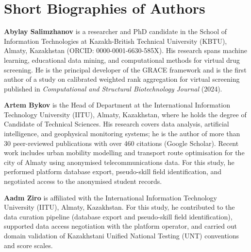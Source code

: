 \documentclass[11pt]{article}
\begin{document}
\section*{Short Biographies of Authors}

\textbf{Abylay Salimzhanov} is a researcher and PhD candidate in the School of
Information Technologies at Kazakh-British Technical University (KBTU), Almaty,
Kazakhstan (ORCID: 0000-0001-6630-585X).
His research spans machine learning, educational data mining, and computational
methods for virtual drug screening.
He is the principal developer of the GRACE framework and is the first author of
a study on calibrated weighted rank aggregation for virtual screening published
in \textit{Computational and Structural Biotechnology Journal} (2024).

\textbf{Artem Bykov} is the Head of Department at the International Information
Technology University (IITU), Almaty, Kazakhstan, where he holds the degree of
Candidate of Technical Sciences.
His research covers data analysis, artificial intelligence, and geophysical
monitoring systems; he is the author of more than 30 peer-reviewed publications
with over 460 citations (Google Scholar).
Recent work includes urban mobility modelling and transport route optimisation
for the city of Almaty using anonymised telecommunications data.
For this study, he performed platform database export, pseudo-skill field
identification, and negotiated access to the anonymised student records.

\textbf{Aadm Ziro} is affiliated with the International Information Technology
University (IITU), Almaty, Kazakhstan.
For this study, he contributed to the data curation pipeline (database export
and pseudo-skill field identification), supported data access negotiation with
the platform operator, and carried out domain validation of Kazakhstani Unified
National Testing (UNT) conventions and score scales.
\end{document}
